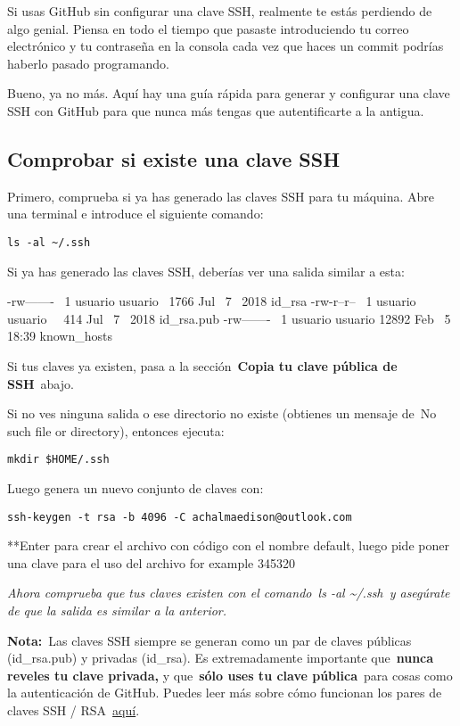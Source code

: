 \documentclass[
  a2paper,
]{article}
\begin{document}
Si usas GitHub sin configurar una clave SSH, realmente te estás
perdiendo de algo genial. Piensa en todo el tiempo que pasaste
introduciendo tu correo electrónico y tu contraseña en la consola cada
vez que haces un commit podrías haberlo pasado programando.

Bueno, ya no más. Aquí hay una guía rápida para generar y configurar una
clave SSH con GitHub para que nunca más tengas que autentificarte a la
antigua.

\hypertarget{comprobar-si-existe-una-clave-ssh}{%
\subsection{Comprobar si existe una clave
SSH}\label{comprobar-si-existe-una-clave-ssh}}

Primero, comprueba si ya has generado las claves SSH para tu máquina.
Abre una terminal e introduce el siguiente comando:

\texttt{ls\ -al\ \textasciitilde{}/.ssh}

Si ya has generado las claves SSH, deberías ver una salida similar a
esta:

-rw-------~ 1 usuario usuario~ 1766 Jul~ 7~ 2018 id\_rsa -rw-r--r--~ 1
usuario usuario~~ 414 Jul~ 7~ 2018 id\_rsa.pub -rw-------~ 1 usuario
usuario 12892 Feb~ 5 18:39 known\_hosts

Si tus claves ya existen, pasa a la sección~\textbf{Copia tu clave
pública de SSH}~abajo.

Si no ves ninguna salida o ese directorio no existe (obtienes un mensaje
de~No such file or directory), entonces ejecuta:

\texttt{mkdir\ \$HOME/.ssh}

Luego genera un nuevo conjunto de claves con:

\texttt{ssh-keygen\ -t\ rsa\ -b\ 4096\ -C\ achalmaedison@outlook.com}

**Enter para crear el archivo con código con el nombre default, luego
pide poner una clave para el uso del archivo for example 345320

\emph{Ahora comprueba que tus claves existen con el comando~ls -al
\textasciitilde/.ssh~y asegúrate de que la salida es similar a la
anterior.}

\textbf{Nota:}~Las claves SSH siempre se generan como un par de claves
públicas (id\_rsa.pub) y privadas (id\_rsa). Es extremadamente
importante que~\textbf{nunca reveles tu clave privada,} y
que~\textbf{sólo uses tu clave pública}~para cosas como la autenticación
de GitHub. Puedes leer más sobre cómo funcionan los pares de claves SSH
/
RSA~\href{https://www.freecodecamp.org/news/a-top-down-introduction-to-ssh-965f4fadd32e/}{aquí}.
\end{document}
